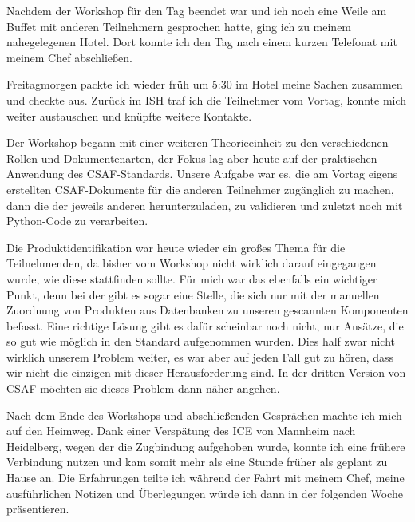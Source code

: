 Nachdem der Workshop für den Tag beendet war und ich noch eine Weile am Buffet mit anderen Teilnehmern gesprochen hatte, ging ich zu meinem nahegelegenen Hotel.
Dort konnte ich den Tag nach einem kurzen Telefonat mit meinem Chef abschließen.


Freitagmorgen packte ich wieder früh um 5:30 im Hotel meine Sachen zusammen und checkte aus.
Zurück im ISH traf ich die Teilnehmer vom Vortag, konnte mich weiter austauschen und knüpfte weitere Kontakte.

Der Workshop begann mit einer weiteren Theorieeinheit zu den verschiedenen Rollen und Dokumentenarten, der Fokus lag aber heute auf der praktischen Anwendung des CSAF-Standards.
Unsere Aufgabe war es, die am Vortag eigens erstellten CSAF-Dokumente für die anderen Teilnehmer zugänglich zu machen, dann die der jeweils anderen herunterzuladen, zu validieren und zuletzt noch mit Python-Code zu verarbeiten.

Die Produktidentifikation war heute wieder ein großes Thema für die Teilnehmenden, da bisher vom Workshop nicht wirklich darauf eingegangen wurde, wie diese stattfinden sollte.
Für mich war das ebenfalls ein wichtiger Punkt, denn bei der \metaeffekt gibt es sogar eine Stelle, die sich nur mit der manuellen Zuordnung von Produkten aus Datenbanken zu unseren gescannten Komponenten befasst.
Eine richtige Lösung gibt es dafür scheinbar noch nicht, nur Ansätze, die so gut wie möglich in den Standard aufgenommen wurden.
Dies half zwar nicht wirklich unserem Problem weiter, es war aber auf jeden Fall gut zu hören, dass wir nicht die einzigen mit dieser Herausforderung sind.
In der dritten Version von CSAF möchten sie dieses Problem dann näher angehen.

Nach dem Ende des Workshops und abschließenden Gesprächen machte ich mich auf den Heimweg.
Dank einer Verspätung des ICE von Mannheim nach Heidelberg, wegen der die Zugbindung aufgehoben wurde, konnte ich eine frühere Verbindung nutzen und kam somit mehr als eine Stunde früher als geplant zu Hause an.
Die Erfahrungen teilte ich während der Fahrt mit meinem Chef, meine ausführlichen Notizen und Überlegungen würde ich dann in der folgenden Woche präsentieren.
